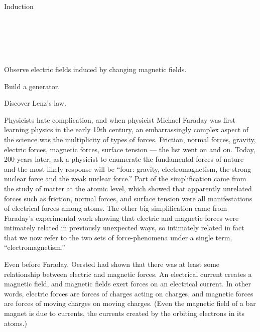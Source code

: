 \begin{lab}{Induction}

\apparatus
{}\\
\\
\\
\\

\begin{goals}

\item[] Observe electric fields induced by changing magnetic fields.

\item[] Build a generator.

\item[] Discover Lenz's law.
\end{goals}

\labintroduction{}

Physicists hate complication, and when physicist Michael
Faraday was first learning physics in the early 19th
century, an embarrassingly complex aspect of the science was
the multiplicity of types of forces. Friction, normal
forces, gravity, electric forces, magnetic forces, surface
tension --- the list went on and on. Today, 200 years later,
ask a physicist to enumerate the fundamental forces of
nature and the most likely response will be ``four: gravity,
electromagnetism, the strong nuclear force and the weak
nuclear force.'' Part of the simplification came from the
study of matter at the atomic level, which showed that
apparently unrelated forces such as friction, normal forces,
and surface tension were all manifestations of electrical
forces among atoms. The other big simplification came from
Faraday's experimental work showing that electric and
magnetic forces were intimately related in previously
unexpected ways, so intimately related in fact that we now
refer to the two sets of force-phenomena under a single
term, ``electromagnetism.''

Even before Faraday, Oersted had shown that there was at
least some relationship between electric and magnetic
forces. An electrical current creates a magnetic field, and
magnetic fields exert forces on an electrical current. In
other words, electric forces are forces of charges acting on
charges, and magnetic forces are forces of moving charges on
moving charges. (Even the magnetic field of a bar magnet is
due to currents, the currents created by the orbiting
electrons in its atoms.)


\end{lab}

